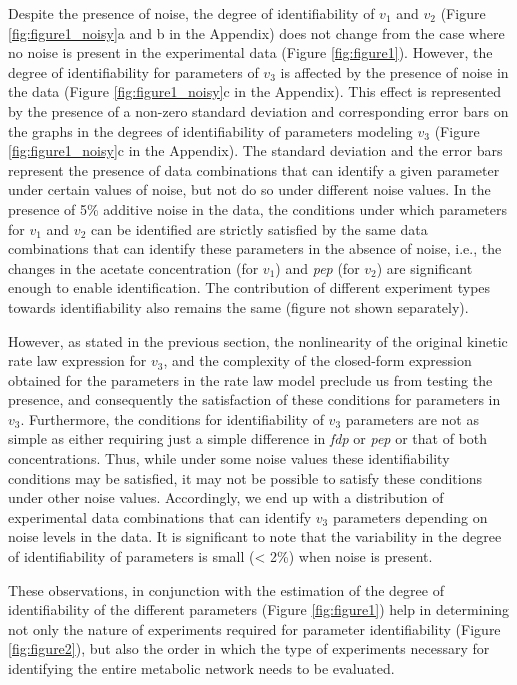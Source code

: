 \documentclass[10pt]{article}
\begin{document}
	Despite the presence of noise, the degree of identifiability of $v_1$ and $v_2$ (Figure \ref{fig:figure1_noisy}a and b in the Appendix) does not change from the case where no noise is present in the experimental data (Figure \ref{fig:figure1}). However, the degree of identifiability for parameters of $v_3$ is affected by the presence of noise in the data (Figure \ref{fig:figure1_noisy}c in the Appendix). This effect is represented by the presence of a non-zero standard deviation and corresponding error bars on the graphs in the degrees of identifiability of parameters modeling $v_3$ (Figure \ref{fig:figure1_noisy}c in the Appendix). The standard deviation and the error bars represent the presence of data combinations that can identify a given parameter under certain values of noise, but not do so under different noise values. In the presence of 5\% additive noise in the data, the conditions under which parameters for $v_1$ and $v_2$ can be identified are strictly satisfied by the same data combinations that can identify these parameters in the absence of noise, i.e., the changes in the acetate concentration (for $v_1$) and \textit{pep} (for $v_2$) are significant enough to enable identification. The contribution of different experiment types towards identifiability also remains the same (figure not shown separately).
	
	However, as stated in the previous section, the nonlinearity of the original kinetic rate law expression for $v_3$, and the complexity of the closed-form expression obtained for the parameters in the rate law model preclude us from testing the presence, and consequently the satisfaction of these conditions for parameters in $v_3$. Furthermore, the conditions for identifiability of $v_3$ parameters are not as simple as either requiring just a simple difference in \textit{fdp} or \textit{pep} or that of both concentrations. Thus, while under some noise values these identifiability conditions may be satisfied, it may not be possible to satisfy these conditions under other noise values. Accordingly, we end up with a distribution of experimental data combinations that can identify $v_3$ parameters depending on noise levels in the data. It is significant to note that the variability in the degree of identifiability of parameters is small (< 2\%) when noise is present.
	
	These observations, in conjunction with the estimation of the degree of identifiability of the different parameters (Figure \ref{fig:figure1}) help in determining not only the nature of experiments required for parameter identifiability (Figure \ref{fig:figure2}), but also the order in which the type of experiments necessary for identifying the entire metabolic network needs to be evaluated.
	
\end{document}
